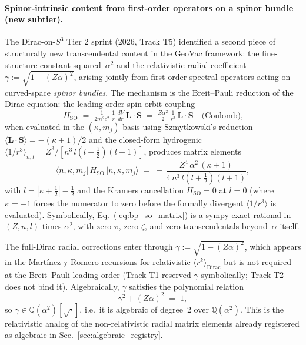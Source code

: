 \paragraph{Spinor-intrinsic content from first-order operators on a
spinor bundle (new subtier).}
The Dirac-on-$S^3$ Tier 2 sprint (2026, Track T5) identified a second
piece of structurally new transcendental content in the GeoVac
framework: the fine-structure constant squared~$\alpha^2$ and the
relativistic radial coefficient $\gamma := \sqrt{1 - (Z\alpha)^2}$,
arising jointly from first-order spectral operators acting on curved-space
\emph{spinor bundles}. The mechanism is the Breit--Pauli reduction of
the Dirac equation: the leading-order spin-orbit coupling
\begin{equation}\label{eq:bp_so}
  H_{\mathrm{SO}}
  \;=\; \tfrac{1}{2 m^2 c^2}\,\tfrac{1}{r}\,\tfrac{dV}{dr}\,\mathbf{L}\cdot\mathbf{S}
  \;=\; \tfrac{Z\alpha^2}{2}\,\tfrac{1}{r^3}\,\mathbf{L}\cdot\mathbf{S}
  \quad\text{(Coulomb),}
\end{equation}
when evaluated in the $(\kappa, m_j)$ basis using Szmytkowski's
reduction $\langle \mathbf{L}\cdot\mathbf{S}\rangle = -(\kappa+1)/2$ and
the closed-form hydrogenic $\langle 1/r^3\rangle_{n,l}
= Z^3/[n^3\, l(l+\tfrac{1}{2})(l+1)]$, produces matrix elements
\begin{equation}\label{eq:bp_so_matrix}
  \langle n,\kappa,m_j|\,H_{\mathrm{SO}}\,|n,\kappa,m_j\rangle
  \;=\; -\,\frac{Z^4\,\alpha^2\,(\kappa+1)}{4\,n^3\, l(l+\tfrac{1}{2})(l+1)},
\end{equation}
with $l = |\kappa + \tfrac{1}{2}| - \tfrac{1}{2}$ and the Kramers
cancellation $H_{\mathrm{SO}} = 0$ at $l=0$ (where $\kappa = -1$ forces
the numerator to zero before the formally divergent $\langle 1/r^3\rangle$
is evaluated). Symbolically, Eq.~(\ref{eq:bp_so_matrix}) is a sympy-exact
rational in $(Z, n, l)$ times $\alpha^2$, with zero $\pi$, zero $\zeta$,
and zero transcendentals beyond~$\alpha$ itself.

The full-Dirac radial corrections enter through
$\gamma := \sqrt{1 - (Z\alpha)^2}$, which appears in the Martínez-y-Romero
recursions for relativistic $\langle r^k\rangle_{\text{Dirac}}$ but is not
required at the Breit--Pauli leading order (Track T1 reserved $\gamma$
symbolically; Track T2 does not bind it). Algebraically, $\gamma$
satisfies the polynomial relation
\begin{equation}\label{eq:gamma_def}
  \gamma^2 + (Z\alpha)^2 \;=\; 1,
\end{equation}
so $\gamma \in \mathbb{Q}(\alpha^2)[\sqrt{\cdot}]$, i.e.\ it is
algebraic of degree~2 over $\mathbb{Q}(\alpha^2)$. This is the
relativistic analog of the non-relativistic radial matrix elements
already registered as algebraic in Sec.~\ref{sec:algebraic_registry}.

